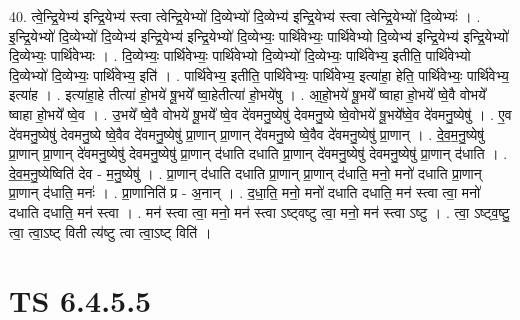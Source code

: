\documentclass[17pt]{extarticle}
\begin{document}
40. त्वे॒न्द्रि॒येभ्य॑ इन्द्रि॒येभ्य॑ स्त्वा त्वेन्द्रि॒येभ्यो॑ दि॒व्येभ्यो॑ दि॒व्येभ्य॑ इन्द्रि॒येभ्य॑ स्त्वा त्वेन्द्रि॒येभ्यो॑ दि॒व्येभ्यः॑ । . इ॒न्द्रि॒येभ्यो॑ दि॒व्येभ्यो॑ दि॒व्येभ्य॑ इन्द्रि॒येभ्य॑ इन्द्रि॒येभ्यो॑ दि॒व्येभ्यः॒ पार्थि॑वेभ्यः॒ पार्थि॑वेभ्यो दि॒व्येभ्य॑ इन्द्रि॒येभ्य॑ इन्द्रि॒येभ्यो॑ दि॒व्येभ्यः॒ पार्थि॑वेभ्यः । . दि॒व्येभ्यः॒ पार्थि॑वेभ्यः॒ पार्थि॑वेभ्यो दि॒व्येभ्यो॑ दि॒व्येभ्यः॒ पार्थि॑वेभ्य॒ इतीति॒ पार्थि॑वेभ्यो दि॒व्येभ्यो॑ दि॒व्येभ्यः॒ पार्थि॑वेभ्य॒ इति॑ । . पार्थि॑वेभ्य॒ इतीति॒ पार्थि॑वेभ्यः॒ पार्थि॑वेभ्य॒ इत्या॑हा॒ हेति॒ पार्थि॑वेभ्यः॒ पार्थि॑वेभ्य॒ इत्या॑ह । . इत्या॑हा॒हे तीत्या॑ हो॒भये॑ षू॒भये᳚ ष्वा॒हेतीत्या॑ हो॒भये॑षु । . आ॒हो॒भये॑ षू॒भये᳚ ष्वाहा हो॒भये᳚ ष्वे॒वै वोभये᳚ ष्वाहा हो॒भये᳚ ष्वे॒व । . उ॒भये᳚ ष्वे॒वै वोभये॑ षू॒भये᳚ ष्वे॒व दे॑वमनु॒ष्येषु॑ देवमनु॒ष्ये ष्वे॒वोभये॑ षू॒भये᳚ष्वे॒व दे॑वमनु॒ष्येषु॑ । . ए॒व दे॑वमनु॒ष्येषु॑ देवमनु॒ष्ये ष्वे॒वैव दे॑वमनु॒ष्येषु॑ प्रा॒णान् प्रा॒णान् दे॑वमनु॒ष्ये
ष्वे॒वैव दे॑वमनु॒ष्येषु॑ प्रा॒णान् । . दे॒व॒म॒नु॒ष्येषु॑ प्रा॒णान् प्रा॒णान् दे॑वमनु॒ष्येषु॑ देवमनु॒ष्येषु॑ प्रा॒णान् द॑धाति दधाति प्रा॒णान् दे॑वमनु॒ष्येषु॑ देवमनु॒ष्येषु॑ प्रा॒णान् द॑धाति । . दे॒व॒म॒नु॒ष्येष्विति॑ देव - म॒नु॒ष्येषु॑ । . प्रा॒णान् द॑धाति दधाति प्रा॒णान् प्रा॒णान् द॑धाति॒ मनो॒ मनो॑ दधाति प्रा॒णान् प्रा॒णान् द॑धाति॒ मनः॑ । . प्रा॒णानिति॑ प्र - अ॒नान् । . द॒धा॒ति॒ मनो॒ मनो॑ दधाति दधाति॒ मन॑ स्त्वा त्वा॒ मनो॑ दधाति दधाति॒ मन॑ स्त्वा । . मन॑ स्त्वा त्वा॒ मनो॒ मन॑ स्त्वा ऽष्ट्वष्टु त्वा॒ मनो॒ मन॑ स्त्वा ऽष्टु । . त्वा॒ ऽष्ट्व॒ष्टु॒ त्वा॒ त्वा॒ऽष्ट् विती त्य॑ष्टु त्वा त्वा॒ऽष्ट् विति॑ । \newline
\pagebreak
{}

\section{ TS 6.4.5.5 }
\end{document}
